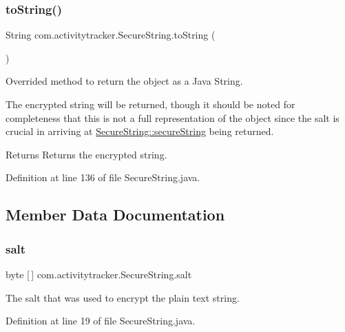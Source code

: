 \subsubsection{\texorpdfstring{to\+String()}{toString()}}
{\footnotesize\ttfamily String com.\+activitytracker.\+Secure\+String.\+to\+String (\begin{DoxyParamCaption}{ }\end{DoxyParamCaption})}

Overrided method to return the object as a Java String.

The encrypted string will be returned, though it should be noted for completeness that this is not a full representation of the object since the salt is crucial in arriving at \mbox{\hyperlink{classcom_1_1activitytracker_1_1_secure_string_a1448f7b8865c6c57cc7218662ee7f1ee}{Secure\+String\+::secure\+String}} being returned.

\begin{DoxyReturn}{Returns}
Returns the encrypted string. 
\end{DoxyReturn}


Definition at line 136 of file Secure\+String.\+java.



\subsection{Member Data Documentation}
\mbox{\label{classcom_1_1activitytracker_1_1_secure_string_a8549ead1f186ff0c2520818b03d1cc21}} 
\subsubsection{\texorpdfstring{salt}{salt}}
{\footnotesize\ttfamily byte \mbox{[}$\,$\mbox{]} com.\+activitytracker.\+Secure\+String.\+salt\hspace{0.3cm}{\ttfamily [private]}}

The salt that was used to encrypt the plain text string. 

Definition at line 19 of file Secure\+String.\+java.

\mbox{\label{classcom_1_1activitytracker_1_1_secure_string_a1448f7b8865c6c57cc7218662ee7f1ee}} 
